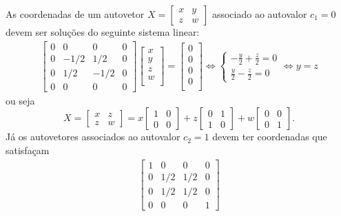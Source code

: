 \documentclass[12pt,a4paper]{article}
\begin{document}
\begin{ExerciseList}
\begin{enumerate}
As coordenadas de um autovetor $X =
\begin{bmatrix}
x & y \\
z & w
\end{bmatrix}$ associado ao autovalor $c_1 = 0$ devem ser soluções do seguinte sistema linear:
\begin{align*}
\begin{bmatrix}
0 & 0 & 0 & 0 \\
0 & -1/2 & 1/2 & 0 \\
0 & 1/2 & -1/2 & 0 \\
0 & 0 & 0 & 0
\end{bmatrix}
\begin{bmatrix}
x \\
y \\
z \\
w \\
\end{bmatrix}
=
\begin{bmatrix}
0 \\
0 \\
0 \\
0 \\
\end{bmatrix}
\Leftrightarrow
\begin{cases}
-\frac{y}{2}+\frac{z}{2} = 0\\
 \frac{y}{2}-\frac{z}{2} = 0
\end{cases}
\Leftrightarrow
y=z
\end{align*}
ou seja
\[
X =
\begin{bmatrix}
x & z \\
z & w
\end{bmatrix}
=
x
\begin{bmatrix}
1 & 0 \\
0 & 0
\end{bmatrix}
+z
\begin{bmatrix}
0 & 1 \\
1 & 0
\end{bmatrix}
+w
\begin{bmatrix}
0 & 0 \\
0 & 1
\end{bmatrix}.
\]
Já os autovetores associados ao autovalor $c_2 = 1$ devem ter coordenadas que satisfaçam
\begin{align*}
\begin{bmatrix}
1 & 0 & 0 & 0 \\
0 & 1/2 & 1/2 & 0 \\
0 & 1/2 & 1/2 & 0 \\
0 & 0 & 0 & 1

\end{bmatrix}
\end{align*}
\end{enumerate}
\end{ExerciseList}
\end{document}
